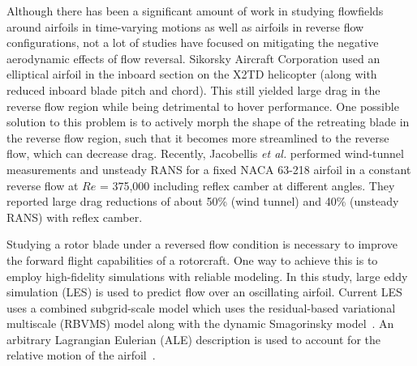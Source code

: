 Although there has been a significant amount of work in studying flowfields around airfoils in time-varying motions as well as airfoils in reverse flow configurations, not a lot of studies have focused on mitigating the negative aerodynamic effects of flow reversal. Sikorsky Aircraft Corporation used an elliptical airfoil in the
inboard section on the X2TD helicopter \cite{bib:bagai2008} (along with reduced inboard blade pitch
and chord). This still yielded large drag in the reverse flow region while being detrimental to hover performance. 
One possible solution to this problem is to actively morph the shape of the retreating blade in the reverse flow region, such that it becomes more streamlined to the reverse flow, which can decrease drag. 
Recently, Jacobellis \textit{et al.} \cite{bib:jacobellis2018} performed wind-tunnel measurements and unsteady RANS for a fixed NACA 63-218 airfoil
in a constant reverse flow at $Re$ = 375,000 including reflex camber at different angles.
They reported large drag reductions of about 50\% (wind tunnel) and 40\% (unsteady RANS) with reflex camber.

Studying a rotor blade under a reversed flow condition
is necessary to improve the forward flight capabilities of a rotorcraft.
One way to achieve this is to employ high-fidelity simulations with reliable modeling.
In this study, large eddy simulation (LES) is used to predict flow over an oscillating airfoil.
Current LES uses a combined subgrid-scale model which uses the residual-based variational multiscale (RBVMS) model 
along with the dynamic Smagorinsky model~\cite{bib:tran2017b}.
An arbitrary Lagrangian Eulerian (ALE) description is used to account for
the relative motion of the airfoil~\cite{bib:cummings2016bbaa}. 




